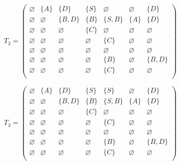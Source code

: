 \begin{figure}
	\[
	T_2 = \begin{pmatrix}
	\varnothing & \{A\} & \{D\} & \{S\} & \varnothing & \varnothing & \{D\} \\
	
	\varnothing & \varnothing & \{B, D\} & \{B\} & \{S,B\} & \{A\} & \{D\} \\
	
	\varnothing & \varnothing & \varnothing & \{C\} & \varnothing & \varnothing & \varnothing \\
	
	\varnothing & \varnothing & \varnothing & \varnothing & \{C\} & \varnothing & \varnothing \\
	
	\varnothing & \varnothing & \varnothing & \varnothing & \varnothing & \varnothing & \varnothing \\
	
	\varnothing & \varnothing & \varnothing & \varnothing & \{B\} & \varnothing & \{B, D\} \\
	
	\varnothing & \varnothing & \varnothing & \varnothing & \{C\} & \varnothing & \varnothing \\
	\end{pmatrix}
	\]
	
	\[
	T_3 = \begin{pmatrix}
	\varnothing & \{A\} & \{D\} & \{S\} & \{S\} & \varnothing & \{D\} \\
	
	\varnothing & \varnothing & \{B, D\} & \{B\} & \{S,B\} & \{A\} & \{D\} \\
	
	\varnothing & \varnothing & \varnothing & \{C\} & \varnothing & \varnothing & \varnothing \\
	
	\varnothing & \varnothing & \varnothing & \varnothing & \{C\} & \varnothing & \varnothing \\
	
	\varnothing & \varnothing & \varnothing & \varnothing & \varnothing & \varnothing & \varnothing \\
	
	\varnothing & \varnothing & \varnothing & \varnothing & \{B\} & \varnothing & \{B, D\} \\
	
	\varnothing & \varnothing & \varnothing & \varnothing & \{C\} & \varnothing & \varnothing \\
	\end{pmatrix}
	\]
	

\end{figure}
